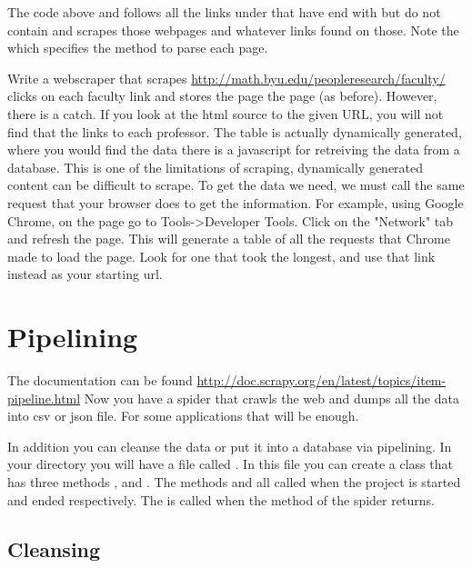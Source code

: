 {The code above and follows all the links under  that have end with  but do not contain  and scrapes those webpages and whatever links found on those.
Note the  which specifies the  method to parse each page.


\begin{problem}
Write a webscraper that scrapes \url{http://math.byu.edu/peopleresearch/faculty/} clicks on each faculty link and stores the page the page (as before). 
However, there is a catch. If you look at the html source to the given URL, you will not find that the links to each professor. The table is actually dynamically generated, where you would find the data there is a javascript for retreiving the data from a database. This is one of the limitations of scraping, dynamically generated content can be difficult to scrape. To get the data we need, we must call the same request that your browser does to get the information. For example, using Google Chrome, on the page go to Tools->Developer Tools. Click on the "Network" tab and refresh the page. This will generate a table of all the requests that Chrome made to load the page. Look for one that took the longest, and use that link instead as your starting url. 
\end{problem}

\section*{Pipelining}

The documentation can be found \url{http://doc.scrapy.org/en/latest/topics/item-pipeline.html}
Now you have a spider that crawls the web and dumps all the data into csv or json file. For some applications that will be enough. 

In addition you can cleanse the data or put it into a database via pipelining. 
In your directory  you will have a file called . 
In this file you can create a class that has three methods ,  and . The methods  and  all called when the project is started and ended respectively. The  is called when the  method of the spider returns. 

\subsection*{Cleansing}

}
